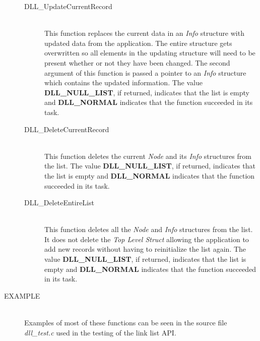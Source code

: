 \documentclass[10pt,letterpaper,titlepage]{article}
\begin{document}
\begin{description}
\begin{description}
 \item[DLL\_UpdateCurrentRecord]\quad\\
 This function replaces the current data in an \emph{Info} structure with updated data from the application.  The entire structure gets overwritten so all elements in the updating structure will need to be present whether or not they have been changed.  The second argument of this function is passed a pointer to an \emph{Info} structure which contains the updated information.  The value \textbf{DLL\_NULL\_LIST}, if returned, indicates that the list is empty and \textbf{DLL\_NORMAL} indicates that the function succeeded in its task.

 \item[DLL\_DeleteCurrentRecord]\quad\\
 This function deletes the current \emph{Node} and its \emph{Info} structures from the list.  The value \textbf{DLL\_NULL\_LIST}, if returned, indicates that the list is empty and \textbf{DLL\_NORMAL} indicates that the function succeeded in its task.

 \item[DLL\_DeleteEntireList]\quad\\
 This function deletes all the \emph{Node} and \emph{Info} structures from the list.  It does not delete the \emph{Top Level Struct} allowing the application to add new records without having to reinitialize the list again.  The value \textbf{DLL\_NULL\_LIST}, if returned, indicates that the list is empty and \textbf{DLL\_NORMAL} indicates that the function succeeded in its task.
 \end{description}

\item[EXAMPLE]\quad\\
Examples of most of these functions can be seen in the source file \emph{dll\_test.c} used in the testing of the link list API.

\end{description}
\newpage
\end{document}
